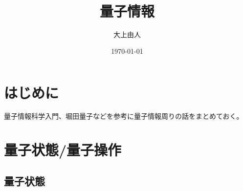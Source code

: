 \documentclass[a4paper,11pt]{jsarticle}
\numberwithin{equation}{section}
\begin{document}
\title{量子情報}
\author{大上由人}
\date{\today}
\maketitle

\section{はじめに}
量子情報科学入門、堀田量子などを参考に量子情報周りの話をまとめておく。

\section{量子状態/量子操作}
\subsection{量子状態}
\end{document}
